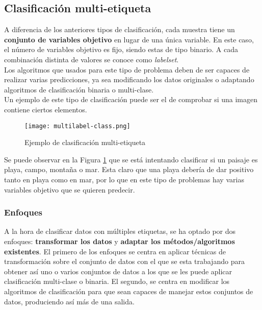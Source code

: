 \subsection{Clasificación multi-etiqueta}
\label{sec:ml}
A diferencia de los anteriores tipos de clasificación, cada muestra tiene un \textbf{conjunto de variables objetivo} en lugar de una única variable. En este caso, el número de variables objetivo es fijo, siendo estas de tipo binario. A cada combinación distinta de valores se conoce como \textit{labelset}.\\
Los algoritmos que usados para este tipo de problema deben de ser capaces de realizar varias predicciones, ya sea modificando los datos originales o adaptando algoritmos de clasificación binaria o multi-clase.\\
\linebreak
Un ejemplo de este tipo de clasificación puede ser el de comprobar si una imagen contiene ciertos elementos.
\begin{figure}[H]
	\centering
	\texttt{[image: multilabel-class.png]}
	\caption{Ejemplo de clasificación multi-etiqueta}
	\label{fig:mlclasss}
\end{figure}
Se puede observar en la Figura \ref{fig:mlclasss} que se está intentando clasificar si un paisaje es playa, campo, montaña o mar. Esta claro que una playa debería de dar positivo tanto en playa como en mar, por lo que en este tipo de problemas hay varias variables objetivo que se quieren predecir.\\
\linebreak
\subsubsection*{Enfoques}
A la hora de clasificar datos con múltiples etiquetas, se ha optado por dos enfoques: \textbf{transformar los datos} y \textbf{adaptar los métodos/algoritmos existentes}. \linebreak
El primero de los enfoques se centra en aplicar técnicas de transformación sobre el conjunto de datos con el que se esta trabajando para obtener así uno o varios conjuntos de datos a los que se les puede aplicar clasificación multi-clase o binaria. \linebreak
El segundo, se centra en modificar los algoritmos de clasificación para que sean capaces de manejar estos conjuntos de datos, produciendo así más de una salida.
